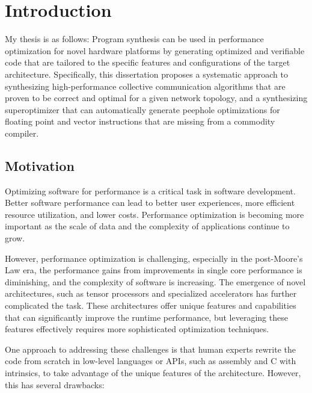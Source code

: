 \chapter{Introduction}
\label{chap:intro}

My thesis is as follows:
%
Program synthesis can be used in performance optimization for novel
hardware platforms by generating optimized and verifiable code that
are tailored to the specific features and configurations of the target
architecture.
%
Specifically, this dissertation proposes a systematic approach to
synthesizing high-performance collective communication algorithms that
are proven to be correct and optimal for a given network topology, and
a synthesizing superoptimizer that can automatically generate peephole
optimizations for floating point and vector instructions that are
missing from a commodity compiler.

\section{Motivation}

Optimizing software for performance is a critical task in software
development.
%
Better software performance can lead to better user experiences, more
efficient resource utilization, and lower costs.
%
Performance optimization is becoming more important as the
scale of data and the complexity of applications continue to grow.


However, performance optimization is challenging, especially in the
post-Moore's Law era, the performance gains from improvements in
single core performance is diminishing, and the complexity of
software is increasing.
%
The emergence of novel architectures, such as tensor processors and
specialized accelerators has further complicated the task.
%
These architectures offer unique features and capabilities that can
significantly improve the runtime performance, but leveraging these
features effectively requires more sophisticated optimization
techniques.

One approach to addressing these challenges is that human experts
rewrite the code from scratch in low-level languages or APIs, such as assembly
and C with intrinsics, to take advantage of the unique features of the
architecture. However, this has several drawbacks:

